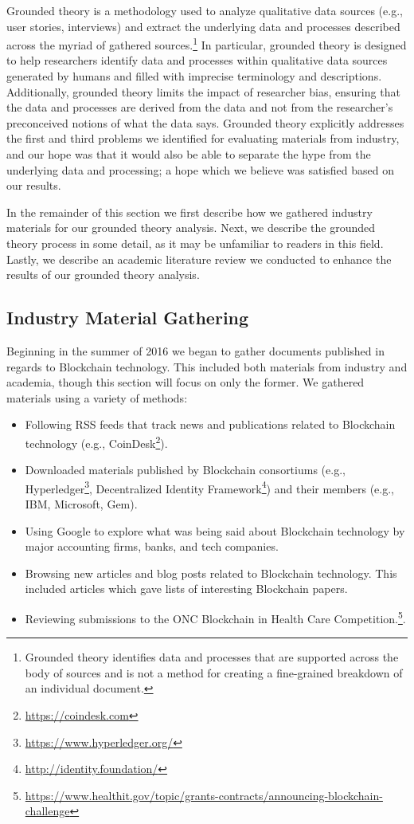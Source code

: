 Grounded theory is a methodology used to analyze qualitative data sources (e.g., user stories, interviews) and extract the underlying data and processes described across the myriad of gathered sources.\footnote{Grounded theory identifies data and processes that are supported across the body of sources and is not a method for creating a fine-grained breakdown of an individual document.}
In particular, grounded theory is designed to help researchers identify data and processes within qualitative data sources generated by humans and filled with imprecise terminology and descriptions.
Additionally, grounded theory limits the impact of researcher bias, ensuring that the data and processes are derived from the data and not from the researcher's preconceived notions of what the data says.
Grounded theory explicitly addresses the first and third problems we identified for evaluating materials from industry, and our hope was that it would also be able to separate the hype from the underlying data and processing; a hope which we believe was satisfied based on our results.

In the remainder of this section we first describe how we gathered industry materials for our grounded theory analysis.
Next, we describe the grounded theory process in some detail, as it may be unfamiliar to readers in this field.
Lastly, we describe an academic literature review we conducted to enhance the results of our grounded theory analysis.

\subsection{Industry Material Gathering}
Beginning in the summer of 2016 we began to gather documents published in regards to Blockchain technology.
This included both materials from industry and academia, though this section will focus on only the former.
We gathered materials using a variety of methods:

\begin{itemize}
	\item Following RSS feeds that track news and publications related to Blockchain technology (e.g., CoinDesk\footnote{\url{https://coindesk.com}}).
	\item Downloaded materials published by Blockchain consortiums (e.g., Hyperledger\footnote{\url{https://www.hyperledger.org/}}, Decentralized Identity Framework\footnote{\url{http://identity.foundation/}}) and their members (e.g., IBM, Microsoft, Gem).
	\item Using Google to explore what was being said about Blockchain technology by major accounting firms, banks, and tech companies.
	\item Browsing new articles and blog posts related to Blockchain technology. This included articles which gave lists of interesting Blockchain papers.
	\item Reviewing submissions to the ONC Blockchain in Health Care Competition.\footnote{\url{https://www.healthit.gov/topic/grants-contracts/announcing-blockchain-challenge}}.
\end{itemize}

